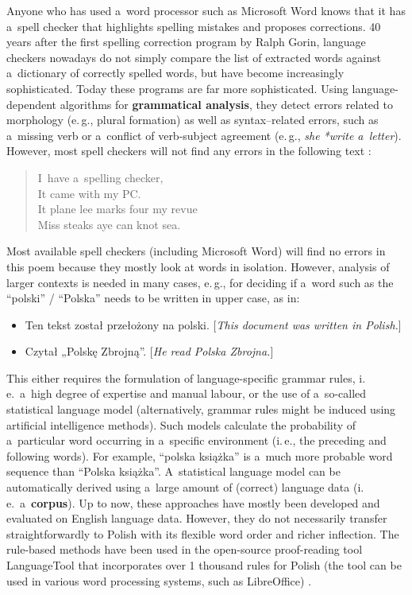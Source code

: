 \begin{multicols}{2}
Anyone who has used a~word processor such as Microsoft Word knows that
it has a~spell checker that highlights spelling mistakes and proposes
corrections. 40 years after the first spelling correction program by
Ralph Gorin, language checkers nowadays do not simply compare the list
of extracted words against a~dictionary of correctly spelled words,
but have become increasingly sophisticated. Today these programs are
far more sophisticated. Using language-dependent algorithms for
\textbf{grammatical analysis}, they detect errors related to
morphology (e.\,g., plural formation) as well as syntax--related
errors, such as a~missing verb or a~conflict of verb-subject agreement
(e.\,g., \textit{she *write a~letter}). However, most spell checkers
will not find any errors in the following text \cite{zar1}: 

\begin{verse} I~have a~spelling checker,\\
It came with my PC.\\
It plane lee marks four my revue\\
Miss steaks aye can knot sea. \end{verse} 

Most available spell checkers (including Microsoft Word) will find no
errors in this poem because they mostly look at words in isolation.
However, analysis of larger contexts is needed in many cases, e.\,g.,
for deciding if a~word such as the “polski” / “Polska” needs
to be written in upper case, as in: 

\begin{itemize} \item Ten tekst został przełożony na polski.
[\textit{This document was written in Polish.}] \item Czytał
„Polskę Zbrojną”. [\textit{He read Polska Zbrojna.}]
\end{itemize} 

This either requires the formulation of language-specific grammar
rules, i.\,e.~a~high degree of expertise and manual labour, or the use
of a~so-called statistical language model (alternatively, grammar
rules might be induced using artificial intelligence methods). Such
models calculate the probability of a~particular word occurring in
a~specific environment (i.\,e., the preceding and following words). For
example, “polska książka” is a~much more probable word sequence
than “Polska książka”. A~statistical language model can be
automatically derived using a~large amount of (correct) language data
(i.\,e.~a~\textbf{corpus}). Up to now, these approaches have mostly
been developed and evaluated on English language data. However, they
do not necessarily transfer straightforwardly to Polish with its
flexible word order and richer inflection. The rule-based methods have
been used in the open-source proof-reading tool LanguageTool that
incorporates over 1 thousand rules for Polish (the tool can be used in
various word processing systems, such as LibreOffice) \cite{lto1,
Mikowski2010}. 


\end{multicols}
